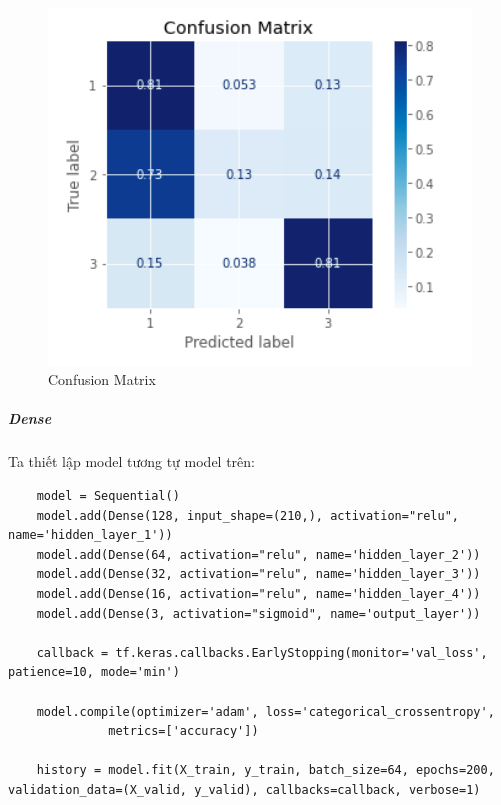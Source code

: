 \documentclass{article}
\begin{document}
\begin{enumerate}
\begin{itemize}
\begin{figure}[H]
			            \includegraphics[width=6in]{images/confusionMatrixSVM_model2_0.png}
			            \caption{Confusion Matrix}
		            \end{figure}
	      \end{itemize}
\end{enumerate}

\subparagraph{Dense}

Ta thiết lập model tương tự model trên:

\begin{verbatim}
	model = Sequential()
	model.add(Dense(128, input_shape=(210,), activation="relu", name='hidden_layer_1'))
	model.add(Dense(64, activation="relu", name='hidden_layer_2'))
	model.add(Dense(32, activation="relu", name='hidden_layer_3'))
	model.add(Dense(16, activation="relu", name='hidden_layer_4'))
	model.add(Dense(3, activation="sigmoid", name='output_layer'))

	callback = tf.keras.callbacks.EarlyStopping(monitor='val_loss', patience=10, mode='min')

	model.compile(optimizer='adam', loss='categorical_crossentropy',
              metrics=['accuracy'])
	
	history = model.fit(X_train, y_train, batch_size=64, epochs=200, validation_data=(X_valid, y_valid), callbacks=callback, verbose=1)
\end{verbatim}
\end{document}
